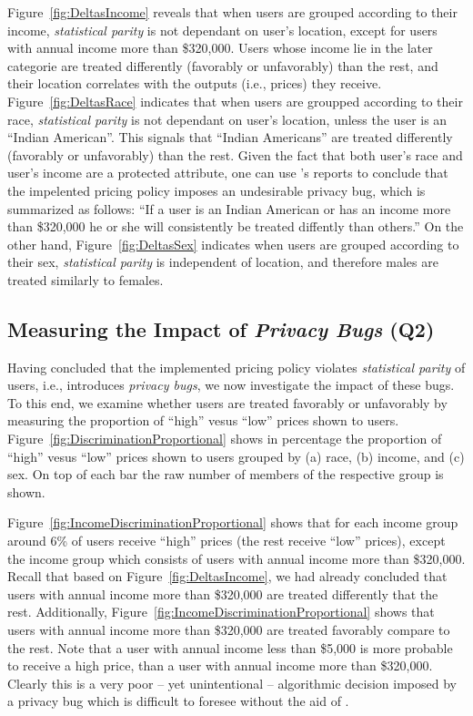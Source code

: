 Figure~\ref{fig:DeltasIncome} reveals that when users are grouped according to
their income, {\em statistical parity} is not dependant on user's location,
except for users with annual income more than \$320,000. Users whose income
lie in the later
categorie are treated differently (favorably or unfavorably) than the rest,
and their location correlates with the outputs (i.e., prices) they receive.
Figure~\ref{fig:DeltasRace} indicates that when users are groupped according
to their race, {\em statistical parity} is not dependant on user's location,
unless the user is an ``Indian American''. This signals that ``Indian
Americans'' are treated differently (favorably or unfavorably) than the rest.
Given the fact that both user's race and user's income are a protected
attribute, one can use \sysname's reports to conclude that the impelented
pricing policy imposes an undesirable privacy bug, which is
summarized as follows: ``If a user is an Indian American or has an income more
than \$320,000 he or she will consistently be treated diffently than others.''
On the other hand, Figure~\ref{fig:DeltasSex} indicates when users are grouped
according to their sex, {\em statistical parity} is independent of location,
and therefore males are treated similarly to females.

\subsection{\normalsize Measuring the Impact of {\em Privacy Bugs} (Q2)}
Having concluded that the implemented pricing policy violates {\em statistical
parity} of users, i.e., introduces {\em privacy bugs}, we now investigate the
impact of these bugs. To this end, we examine whether users are treated
favorably or unfavorably by measuring the proportion of ``high'' vesus ``low''
prices shown to users. Figure~\ref{fig:DiscriminationProportional} shows in
percentage the proportion of ``high'' vesus ``low'' prices shown to users
grouped by (a) race, (b) income, and (c) sex. On top of each bar the raw number
of members of the respective group is shown.

Figure~\ref{fig:IncomeDiscriminationProportional} shows that for each income
group around 6\% of users receive ``high'' prices (the rest receive ``low''
prices), except the income group which consists of users with annual income
more than \$320,000. Recall that based on Figure~\ref{fig:DeltasIncome}, we
had already concluded that users with annual income more than \$320,000 are
treated differently that the rest. Additionally,
Figure~\ref{fig:IncomeDiscriminationProportional} shows that users with
annual income more than \$320,000 are treated favorably compare to the rest.
Note that a user with annual income less than \$5,000 is more probable to
receive a high price, than a user with annual income more than \$320,000.
Clearly this is a very poor -- yet unintentional -- algorithmic decision imposed
by a privacy bug which is difficult to foresee without the aid of \sysname.


